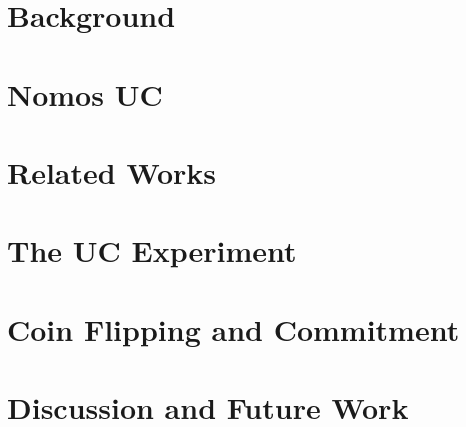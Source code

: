 \documentclass[acmsmall, screen, review, anonymous]{acmart}
\begin{document}
\section{Background} \label{sec:background}


\section{Nomos UC} \label{sec:nomosuc}


\section{Related Works}


%

\section{The UC Experiment} \label{sec:execuc}


\section{Coin Flipping and Commitment} \label{sec:commitment}


%

%
%
%

\section{Discussion and Future Work}

\end{document}
